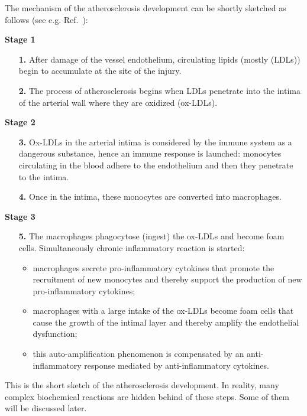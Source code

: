 \documentclass[reqno]{amsart}            %
\numberwithin{equation}{section}
\begin{document}
The mechanism of the atherosclerosis development can be shortly sketched as follows
(see e.g. Ref.~\cite{Fan-Wat}):

\centerline{{\bf Stage 1}}
\begin{enumerate}
\item[{\bf 1.}]
After damage of the vessel endothelium, circulating lipids (mostly (LDLs)) begin to accumulate
at the site of the injury.
  \item[{\bf 2.}]
  The process of atherosclerosis begins when LDLs penetrate into the intima of
the arterial wall where they are oxidized (ox-LDLs).
\end{enumerate}

\centerline{{\bf Stage 2}}

\begin{enumerate}
  \item[{\bf 3.}]
  Ox-LDLs in the arterial intima is considered by the immune system
as a dangerous substance, hence an immune response is launched:
monocytes circulating in the blood adhere to the endothelium and then they penetrate to the intima.
  \item[{\bf 4.}]
  Once in the intima, these monocytes are converted into macrophages.
\end{enumerate}

\centerline{{\bf Stage 3}}

\begin{enumerate}
  \item[{\bf 5.}]
The macrophages phagocytose (ingest) the ox-LDLs and become foam cells. Simultaneously
chronic inflammatory reaction is started:
\begin{itemize}
  \item
  macrophages secrete pro-inflammatory cytokines that promote the recruitment of new monocytes and thereby
  support the production of new pro-inflammatory cytokines;
  \item
  macrophages with a large intake of the ox-LDLs become foam
cells that cause the growth of the intimal layer and thereby amplify the endothelial dysfunction;
\item
 this auto-amplification phenomenon is compensated by an anti-inflammatory response mediated by anti-inflammatory
cytokines. %
\end{itemize}
\end{enumerate}
This is the short sketch of the atherosclerosis development.
In reality, many complex biochemical reactions are hidden behind of these steps. Some of them will be discussed later.
\end{document}
